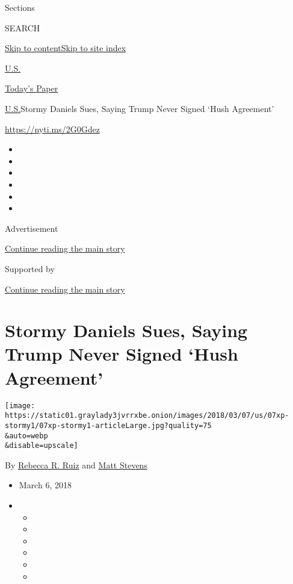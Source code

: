 Sections

SEARCH

\protect\hyperlink{site-content}{Skip to
content}\protect\hyperlink{site-index}{Skip to site index}

\href{https://www.nytimes3xbfgragh.onion/section/us}{U.S.}

\href{https://myaccount.nytimes3xbfgragh.onion/auth/login?response_type=cookie\&client_id=vi}{}

\href{https://www.nytimes3xbfgragh.onion/section/todayspaper}{Today's
Paper}

\href{/section/us}{U.S.}\textbar{}Stormy Daniels Sues, Saying Trump
Never Signed `Hush Agreement'

\url{https://nyti.ms/2G0Gdez}

\begin{itemize}
\item
\item
\item
\item
\item
\item
\end{itemize}

Advertisement

\protect\hyperlink{after-top}{Continue reading the main story}

Supported by

\protect\hyperlink{after-sponsor}{Continue reading the main story}

\hypertarget{stormy-daniels-sues-saying-trump-never-signed-hush-agreement}{%
\section{Stormy Daniels Sues, Saying Trump Never Signed `Hush
Agreement'}\label{stormy-daniels-sues-saying-trump-never-signed-hush-agreement}}

\texttt{[image: https://static01.graylady3jvrrxbe.onion/images/2018/03/07/us/07xp-stormy1/07xp-stormy1-articleLarge.jpg?quality=75\\\&auto=webp\\\&disable=upscale]}

By \href{http://www.nytimes3xbfgragh.onion/by/rebecca-r-ruiz}{Rebecca R.
Ruiz} and \href{https://www.nytimes3xbfgragh.onion/by/matt-stevens}{Matt
Stevens}

\begin{itemize}
\item
  March 6, 2018
\item
  \begin{itemize}
  \item
  \item
  \item
  \item
  \item
  \item
  \end{itemize}
\end{itemize}


